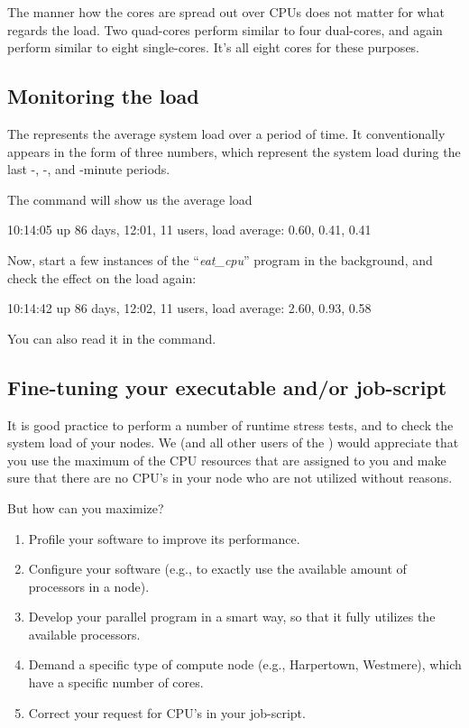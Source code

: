 The manner how the cores are spread out over CPUs does not matter for what
regards the load. Two quad-cores perform similar to four dual-cores, and again
perform similar to eight single-cores. It's all eight cores for these purposes.

\subsection{Monitoring the load}

The  represents the average system load over a period of
time. It conventionally appears in the form of three numbers, which represent
the system load during the last -, -, and
-minute periods.

The  command will show us the average load
\begin{prompt}
10:14:05 up 86 days, 12:01, 11 users, load average: 0.60, 0.41, 0.41
\end{prompt}

Now, start a few instances of the ``\emph{eat\_cpu}'' program in the
background, and check the effect on the load again:

\begin{prompt}
10:14:42 up 86 days, 12:02, 11 users, load average: 2.60, 0.93, 0.58
\end{prompt}

You can also read it in the  command.
\subsection{Fine-tuning your executable and/or job-script}

It is good practice to perform a number of runtime stress tests, and to check
the system load of your nodes. We (and all other users of the \hpc) would
appreciate that you use the maximum of the CPU resources that are assigned to
you and make sure that there are no CPU's in your node who are not utilized
without reasons.

But how can you maximize?

\begin{enumerate}
\item  Profile your software to improve its performance.
\item  Configure your software (e.g., to exactly use the available amount of processors in a node).
\item  Develop your parallel program in a smart way, so that it fully utilizes the available processors.
\item  Demand a specific type of compute node (e.g., Harpertown, Westmere), which have a specific number of cores.
\item  Correct your request for CPU's in your job-script.
\end{enumerate}

